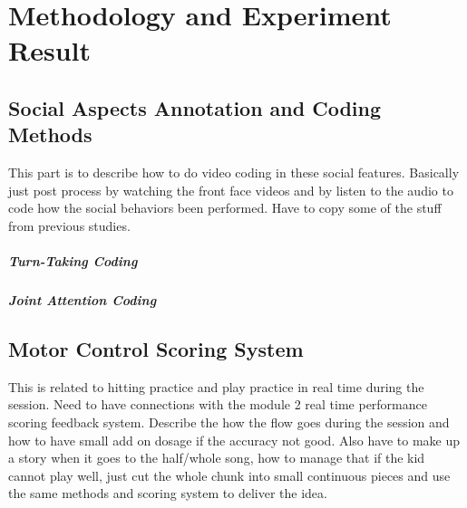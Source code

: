 
\section{Methodology and Experiment Result}

\subsection{Social Aspects Annotation and Coding Methods}
This part is to describe how to do video coding in these social features.
Basically just post process by watching the front face videos and by listen to the
audio to code how the social behaviors been performed. Have to copy some of the stuff
from previous studies.
\subparagraph{Turn-Taking Coding}
\subparagraph{Joint Attention Coding}

\subsection{Motor Control Scoring System}
This is related to hitting practice and play practice in real time during the session.
Need to have connections with the module 2 real time performance scoring feedback system.
Describe the how the flow goes during the session and how to have small add on dosage
if the accuracy not good. 
Also have to make up a story when it goes to the half/whole song, how to manage that
if the kid cannot play well, just cut the whole chunk into small continuous pieces
and use the same methods and scoring system to deliver the idea.

